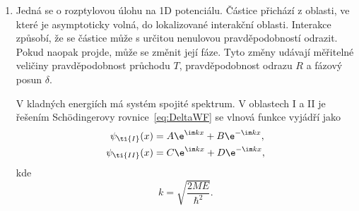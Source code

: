 \begin{solution}
\begin{enumerate}
		Zbývá nanormovat vlnovou funkci, tj. nalézt hodnotu parametru $A$:
		\begin{align}
			1
			&=\int_{-\infty}^{\infty}\abs{\psi(x)}^{2}\d x
			 =\int_{-\infty}^{0}\abs{\psi_{\ti{I}}(x)}^{2}\d x
				+\int_{0}^{\infty}\abs{\psi_{\ti{II}}(x)}^{2}\d x\nonumber\\
			&=\abs{A}^{2}\left\{\int_{-\infty}^{0}\e^{2\kappa x}\d x
				+\int_{0}^{\infty}\e^{-2\kappa x}\d x\right\}\nonumber\\
			&=\abs{A}^{2}\left\{\left[\frac{1}{2\kappa}\e^{2\kappa x}\right]_{-\infty}^{0}
				+\left[-\frac{1}{2\kappa}\e^{-2\kappa x}\right]_{0}^{\infty}\right\}
			 =\frac{\abs{A}^{2}}{\kappa},
		\end{align}
		Při volbě nulové komplexní fáze normalizačního parametru je
		\begin{equation}
            A=D=\sqrt{\kappa}
                =\sqrt{-\frac{Mc}{\hbar^{2}}}
		\end{equation}
		[veličina $\kappa$ byla vyjádřena pomocí~\eqref{eq:Deltakappa} a~\eqref{eq:kappa}].
		Normalizovaná vlnová funkce vázaného stavu~\eqref{eq:DeltaEnergy} je tedy
		\begin{subequations}
			\begin{align}
				\psi_{\ti{I}}(x)
					&=\sqrt{-\frac{Mc}{\hbar^{2}}}\e^{-\frac{Mc}{\hbar^{2}} x},\\
				\psi_{\ti{II}}(x)
					&=\sqrt{-\frac{Mc}{\hbar^{2}}}\e^{\frac{Mc}{\hbar^{2}} x},
			\end{align}
		\end{subequations}
		nebo souhrnně
		\begin{equation}
			\psi(x)=\sqrt{-\frac{Mc}{\hbar^{2}}}\e^{-\frac{Mc}{\hbar^2}\abs{x}}.
		\end{equation}
		Její průběh je znázorněn na obrázku~\ref{fig:DeltaWF}.
		
	\item
		Jedná se o rozptylovou úlohu na 1D potenciálu.
		Částice přichází z oblasti, ve které je asymptoticky volná, do lokalizované interakční oblasti.
		Interakce způsobí, že se částice může s určitou nenulovou pravděpodobností odrazit. 
		Pokud naopak projde, může se změnit její fáze.
		Tyto změny udávají měřitelné veličiny pravděpodobnost průchodu $T$, pravděpodobnost odrazu $R$ a fázový posun $\delta$.

		V kladných energiích má systém spojité spektrum.
		V oblastech I a II je řešením Schödingerovy rovnice~\eqref{eq:DeltaWF} se vlnová funkce vyjádří jako
		\begin{subequations}
			\begin{align}
				\psi_{\ti{I}}(x)&=A\e^{\im k x}+B\e^{-\im k x},\nonumber\\
				\psi_{\ti{II}}(x)&=C\e^{\im k x}+D\e^{-\im k x},
			\end{align}
			\label{eq:DeltaBarrierWF}
		\end{subequations}
		kde
		\begin{equation}
			k=\sqrt{\frac{2ME}{\hbar^{2}}}.
			\label{eq:k}
		\end{equation}
		

\end{enumerate}
\end{solution}
